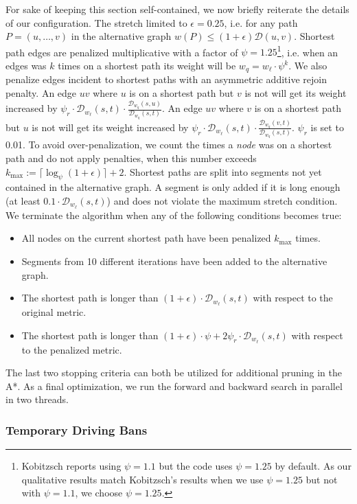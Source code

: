 \documentclass[a4paper,UKenglish,cleveref, autoref, thm-restate]{lipics-v2021}
\newcommand*{\dist}{\mathcal{D}}
\begin{document}
For sake of keeping this section self-contained, we now briefly reiterate the details of our configuration.
The stretch limited to $\epsilon = 0.25$, i.e. for any path $P = (u,\dots,v)$ in the alternative graph $w(P) \leq (1+\epsilon) \dist(u,v)$.
Shortest path edges are penalized multiplicative with a factor of $\psi = 1.25$\footnote{Kobitzsch reports using $\psi = 1.1$ but the code uses $\psi=1.25$ by default. As our qualitative results match Kobitzsch's results when we use $\psi = 1.25$ but not with $\psi = 1.1$, we choose $\psi = 1.25$.}, i.e. when an edges was $k$ times on a shortest path its weight will be $w_q = w_{\ell}\cdot\psi^k$.
We also penalize edges incident to shortest paths with an asymmetric additive rejoin penalty.
An edge $uv$ where $u$ is on a shortest path but $v$ is not will get its weight increased by $\psi_r \cdot \dist_{w_{\ell}}(s,t) \cdot \frac{\dist_{w_q}(s,u)}{\dist_{w_q}(s,t)}$.
An edge $uv$ where $v$ is on a shortest path but $u$ is not will get its weight increased by $\psi_r \cdot \dist_{w_{\ell}}(s,t) \cdot \frac{\dist_{w_q}(v,t)}{\dist_{w_q}(s,t)}$.
$\psi_r$ is set to 0.01.
To avoid over-penalization, we count the times a \emph{node} was on a shortest path and do not apply penalties, when this number exceeds $k_{\max} := \lceil\log_{\psi}(1+\epsilon)\rceil + 2$.
Shortest paths are split into segments not yet contained in the alternative graph.
A segment is only added if it is long enough (at least $0.1 \cdot \dist_{w_{\ell}}(s,t)$) and does not violate the maximum stretch condition.
We terminate the algorithm when any of the following conditions becomes true:
\begin{itemize}
	\item All nodes on the current shortest path have been penalized $k_{\max}$ times.
	\item Segments from 10 different iterations have been added to the alternative graph.
	\item The shortest path is longer than $(1+\epsilon) \cdot \dist_{w_{\ell}}(s,t)$ with respect to the original metric.
	\item The shortest path is longer than $(1+\epsilon) \cdot \psi + 2\psi_r \cdot \dist_{w_{\ell}}(s,t)$ with respect to the penalized metric.
\end{itemize}
The last two stopping criteria can both be utilized for additional pruning in the A*.
As a final optimization, we run the forward and backward search in parallel in two threads.

\subsubsection{Temporary Driving Bans}
\end{document}
